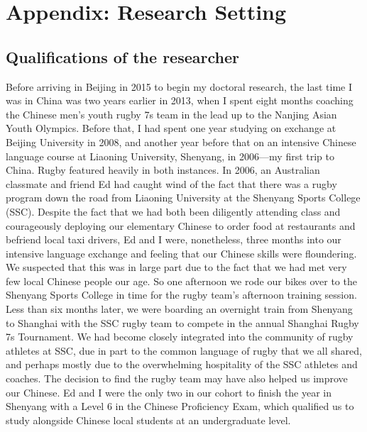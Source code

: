 \chapter{Appendix: Research Setting \label{app3:researchSetting}}

\begin{CJK}{UTF8}{gbsn}







  \section{Qualifications of the researcher\label{app3:qualPositionResearch}}

  Before arriving in Beijing in 2015 to begin my doctoral research, the last time I was in China was two years earlier in 2013, when I spent eight months coaching the Chinese men's youth rugby 7s team in the lead up to the Nanjing Asian Youth Olympics.  Before that, I had spent one year studying on exchange at Beijing University in 2008, and another year before that on an intensive Chinese language course at Liaoning University, Shenyang, in 2006---my first trip to China.  Rugby featured heavily in both instances.  In 2006, an Australian classmate and friend Ed had caught wind of the fact that there was a rugby program down the road from Liaoning University at the Shenyang Sports College (SSC).  Despite the fact that we had both been diligently attending class and courageously deploying our elementary Chinese to order food at restaurants and befriend local taxi drivers, Ed and I were, nonetheless, three months into our intensive language exchange and feeling that our Chinese skills were floundering.  We suspected that this was in large part due to the fact that we had met very few local Chinese people our age.  So one afternoon we rode our bikes over to the Shenyang Sports College in time for the rugby team's afternoon training session.  Less than six months later, we were boarding an overnight train from Shenyang to Shanghai with the SSC rugby team to compete in the annual Shanghai Rugby 7s Tournament.  We had become closely integrated into the community of rugby athletes at SSC, due in part to the common language of rugby that we all shared, and perhaps mostly due to the overwhelming hospitality of the SSC athletes and coaches.  The decision to find the rugby team may have also helped us improve our Chinese. Ed and I were the only two in our cohort to finish the year in Shenyang with a Level 6 in the Chinese Proficiency Exam, which qualified us to study alongside Chinese local students at an undergraduate level.


\end{CJK}
